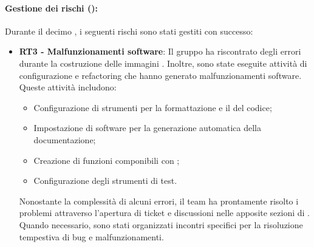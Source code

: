 \paragraph*{Gestione dei rischi ():}
\par Durante il decimo , i seguenti rischi sono stati gestiti con successo:
\begin{itemize}
  \item \textbf{RT3 - Malfunzionamenti software}: Il gruppo ha riscontrato degli errori durante la costruzione delle immagini . Inoltre, sono state eseguite attività di configurazione e refactoring che hanno generato malfunzionamenti software. Queste attività includono:
  \begin{itemize}
    \item Configurazione di strumenti per la formattazione e il  del codice;
    \item Impostazione di software per la generazione automatica della documentazione;
    \item Creazione di funzioni componibili con ;
    \item Configurazione degli strumenti di test.
  \end{itemize}
  Nonostante la complessità di alcuni errori, il team ha prontamente risolto i problemi attraverso l'apertura di ticket e discussioni nelle apposite sezioni di . Quando necessario, sono stati organizzati incontri specifici per la risoluzione tempestiva di bug e malfunzionamenti.
\end{itemize}